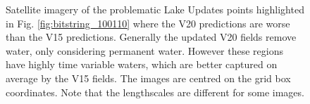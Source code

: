 \documentclass[twocolumn]{article}
\begin{document}
\begin{figure}
	\caption{Satellite imagery of the problematic Lake Updates points highlighted in Fig. \ref{fig:bitstring_100110} where the V20 predictions are worse than the V15 predictions. Generally the updated V20 fields remove water, only considering permanent water. However these regions have highly time variable waters, which are better captured on average by the V15 fields. The images are centred on the grid box coordinates. Note that the lengthscales are different for some images.} 
	\label{fig:example_test}
\end{figure}


	
	
\end{document}
